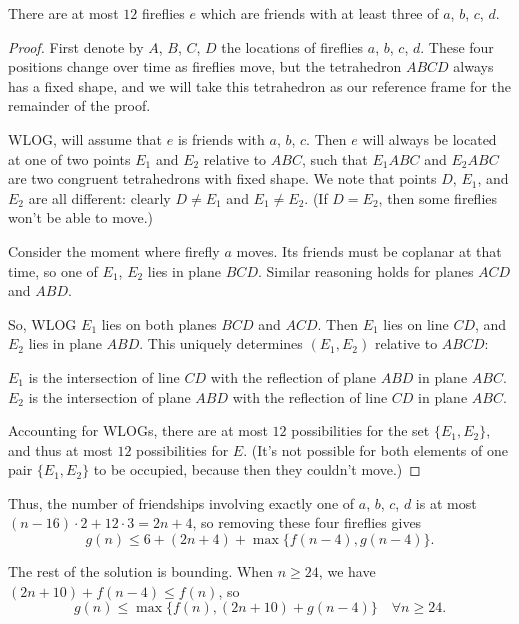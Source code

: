 \documentclass[11pt]{scrartcl}
\begin{document}
\begin{claim*}
  There are at most $12$ fireflies $e$
  which are friends with at least three of $a$, $b$, $c$, $d$.
\end{claim*}
\begin{proof}
  First denote by $A$, $B$, $C$, $D$ the locations
  of fireflies $a$, $b$, $c$, $d$.
  These four positions change over time as fireflies move,
  but the tetrahedron $ABCD$ always has a fixed shape,
  and we will take this tetrahedron as our reference frame
  for the remainder of the proof.

  WLOG, will assume that $e$ is friends with $a$, $b$, $c$.
  Then $e$ will always be located at one of two points $E_1$ and $E_2$
  relative to $ABC$, such that $E_1ABC$ and $E_2ABC$
  are two congruent tetrahedrons with fixed shape.
  We note that points $D$, $E_1$, and $E_2$ are all different:
  clearly $D \neq E_1$ and $E_1 \neq E_2$.
  (If $D = E_2$,
  then some fireflies won't be able to move.)

  Consider the moment where firefly $a$ moves.
  Its friends must be coplanar at that time,
  so one of $E_1$, $E_2$ lies in plane $BCD$.
  Similar reasoning holds for planes $ACD$ and $ABD$.

  So, WLOG $E_1$ lies on both planes $BCD$ and $ACD$.
  Then $E_1$ lies on line $CD$,
  and $E_2$ lies in plane $ABD$.
  This uniquely determines $(E_1, E_2)$ relative to $ABCD$:
  \begin{itemize}
    \ii $E_1$ is the intersection of line $CD$
    with the reflection of plane $ABD$ in plane $ABC$.
    \ii $E_2$ is the intersection of plane $ABD$
    with the reflection of line $CD$ in plane $ABC$.
  \end{itemize}
  Accounting for WLOGs,
  there are at most $12$ possibilities for the set $\{E_1, E_2\}$,
  and thus at most $12$ possibilities for $E$.
  (It's not possible for both elements of one pair $\{E_1, E_2\}$
  to be occupied, because then they couldn't move.)
\end{proof}

Thus, the number of friendships involving exactly one of $a$, $b$, $c$, $d$
is at most $(n-16) \cdot 2 + 12 \cdot 3 = 2n + 4$,
so removing these four fireflies gives
\[ g(n) \le 6 + (2n+4) + \max\{f(n-4), g(n-4)\}. \]

The rest of the solution is bounding.
When $n \ge 24$, we have $(2n+10) + f(n-4) \le f(n)$,
so
\[ g(n) \le \max\{f(n), (2n+10) + g(n-4)\}
\quad \forall n \ge 24. \]
\end{document}
